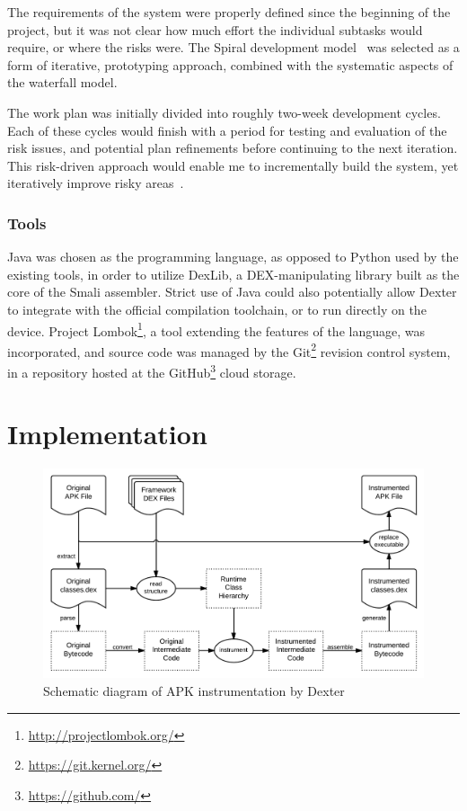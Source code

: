 \documentclass[12pt,twoside,notitlepage]{report}
\newcommand{\weblink}[1] {\footnote{\scriptsize\url{#1}}}
\begin{document}
The requirements of the system were properly defined since the beginning of the project, but it was not clear how much effort the individual subtasks would require, or where the risks were. The Spiral development model~\cite{Boehm:1988:SMS:45797.45801} was selected as a form of iterative, prototyping approach, combined with the systematic aspects of the waterfall model. 

The work plan was initially divided into roughly two-week development cycles. Each of these cycles would finish with a period for testing and evaluation of the risk issues, and potential plan refinements before continuing to the next iteration. This risk-driven approach would enable me to incrementally build the system, yet iteratively improve risky areas~\cite{web:IncrementalVsIterative}.

\subsection{Tools}

Java was chosen as the programming language, as opposed to Python used by the existing tools, in order to utilize DexLib, a DEX-manipulating library built as the core of the Smali assembler. Strict use of Java could also potentially allow Dexter to integrate with the official compilation toolchain, or to run directly on the device. Project Lombok\weblink{http://projectlombok.org/}, a tool extending the features of the language, was incorporated, and source code was managed by the Git\weblink{https://git.kernel.org/} revision control system, in a repository hosted at the GitHub\weblink{https://github.com/} cloud storage.

\cleardoublepage
\chapter{Implementation}

\begin{figure}
	\centerline{	
		\includegraphics[width=\textwidth]{figs/fig_implementation_overview.png}
	}
	\caption{Schematic diagram of APK instrumentation by Dexter}
	\label{fig:Implementation_Overview}
\end{figure}
\end{document}
